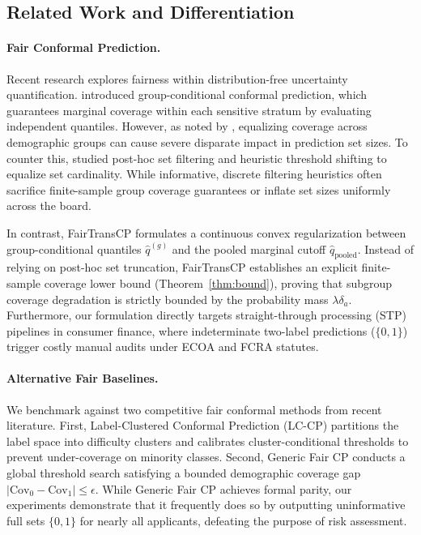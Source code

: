 \documentclass[twoside]{article}
\begin{document}
\subsection{Related Work and Differentiation}
\paragraph{Fair Conformal Prediction.}
Recent research explores fairness within distribution-free uncertainty quantification. \citet{romano2020classification} introduced group-conditional conformal prediction, which guarantees marginal coverage within each sensitive stratum by evaluating independent quantiles. However, as noted by \citet{cresswell2025conformal}, equalizing coverage across demographic groups can cause severe disparate impact in prediction set sizes. To counter this, \citet{cresswell2025conformal} studied post-hoc set filtering and heuristic threshold shifting to equalize set cardinality. While informative, discrete filtering heuristics often sacrifice finite-sample group coverage guarantees or inflate set sizes uniformly across the board. 

In contrast, FairTransCP formulates a continuous convex regularization between group-conditional quantiles $\hat{q}^{(g)}$ and the pooled marginal cutoff $\hat{q}_{\text{pooled}}$. Instead of relying on post-hoc set truncation, FairTransCP establishes an explicit finite-sample coverage lower bound (Theorem~\ref{thm:bound}), proving that subgroup coverage degradation is strictly bounded by the probability mass $\lambda \delta_a$. Furthermore, our formulation directly targets straight-through processing (STP) pipelines in consumer finance, where indeterminate two-label predictions ($\{0, 1\}$) trigger costly manual audits under ECOA and FCRA statutes.

\paragraph{Alternative Fair Baselines.}
We benchmark against two competitive fair conformal methods from recent literature. First, Label-Clustered Conformal Prediction (LC-CP) \citep{liu2024label} partitions the label space into difficulty clusters and calibrates cluster-conditional thresholds to prevent under-coverage on minority classes. Second, Generic Fair CP \citep{maneriker2025fair} conducts a global threshold search satisfying a bounded demographic coverage gap $|\text{Cov}_0 - \text{Cov}_1| \le \epsilon$. While Generic Fair CP achieves formal parity, our experiments demonstrate that it frequently does so by outputting uninformative full sets $\{0, 1\}$ for nearly all applicants, defeating the purpose of risk assessment.
\end{document}
